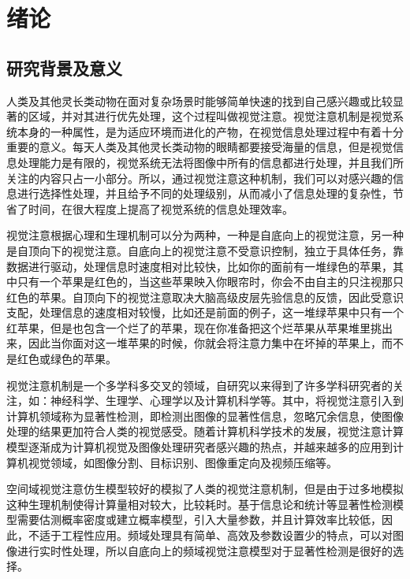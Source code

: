 

\chapter{绪论}
\label{cha1}

\section{研究背景及意义}
\label{1_1}

人类及其他灵长类动物在面对复杂场景时能够简单快速的找到自己感兴趣或比较显著的区域，并对其进行优先处理，这个过程叫做视觉注意。视觉注意机制是视觉系统本身的一种属性，是为适应环境而进化的产物，在视觉信息处理过程中有着十分重要的意义。每天人类及其他灵长类动物的眼睛都要接受海量的信息，但是视觉信息处理能力是有限的，视觉系统无法将图像中所有的信息都进行处理，并且我们所关注的内容只占一小部分。所以，通过视觉注意这种机制，我们可以对感兴趣的信息进行选择性处理，并且给予不同的处理级别，从而减小了信息处理的复杂性，节省了时间，在很大程度上提高了视觉系统的信息处理效率。

视觉注意根据心理和生理机制可以分为两种，一种是自底向上的视觉注意，另一种是自顶向下的视觉注意。自底向上的视觉注意不受意识控制，独立于具体任务，靠数据进行驱动，处理信息时速度相对比较快，比如你的面前有一堆绿色的苹果，其中只有一个苹果是红色的，当这些苹果映入你眼帘时，你会不由自主的只注视那只红色的苹果。自顶向下的视觉注意取决大脑高级皮层先验信息的反馈，因此受意识支配，处理信息的速度相对较慢，比如还是前面的例子，这一堆绿苹果中只有一个红苹果，但是也包含一个烂了的苹果，现在你准备把这个烂苹果从苹果堆里挑出来，因此当你面对这一堆苹果的时候，你就会将注意力集中在坏掉的苹果上，而不是红色或绿色的苹果。

视觉注意机制是一个多学科多交叉的领域，自研究以来得到了许多学科研究者的关注，如：神经科学、生理学、心理学以及计算机科学等。其中，将视觉注意引入到计算机领域称为显著性检测，即检测出图像的显著性信息，忽略冗余信息，使图像处理的结果更加符合人类的视觉感受。随着计算机科学技术的发展，视觉注意计算模型逐渐成为计算机视觉及图像处理研究者感兴趣的热点，并越来越多的应用到计算机视觉领域，如图像分割、目标识别、图像重定向及视频压缩等。

空间域视觉注意仿生模型较好的模拟了人类的视觉注意机制，但是由于过多地模拟这种生理机制使得计算量相对较大，比较耗时。基于信息论和统计等显著性检测模型需要估测概率密度或建立概率模型，引入大量参数，并且计算效率比较低，因此，不适于工程性应用。频域处理具有简单、高效及参数设置少的特点，可以对图像进行实时性处理，所以自底向上的频域视觉注意模型对于显著性检测是很好的选择。

